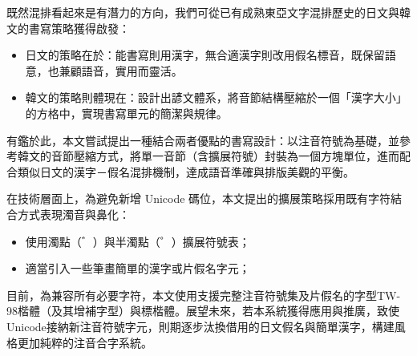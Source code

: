 既然混排看起來是有潛力的方向，我們可從已有成熟東亞文字混排歷史的日文與韓文的書寫策略獲得啟發：
\begin{itemize}
	\item 日文的策略在於：能書寫則用漢字，無合適漢字則改用假名標音，既保留語意，也兼顧語音，實用而靈活。
	\item 韓文的策略則體現在：設計出諺文體系，將音節結構壓縮於一個「漢字大小」的方格中，實現書寫單元的簡潔與規律。
\end{itemize}

有鑑於此，本文嘗試提出一種結合兩者優點的書寫設計：以注音符號為基礎，並參考韓文的音節壓縮方式，將單一音節（含擴展符號）封裝為一個方塊單位，進而配合類似日文的漢字－假名混排機制，達成語音準確與排版美觀的平衡。\par

在技術層面上，為避免新增 Unicode 碼位，本文提出的擴展策略採用既有字符結合方式表現濁音與鼻化：
\begin{itemize}
	\item 使用濁點（゛）與半濁點（゜）擴展符號表；
	\item 適當引入一些筆畫簡單的漢字或片假名字元；
\end{itemize}
目前，為兼容所有必要字符，本文使用支援完整注音符號集及片假名的字型TW-98楷體（及其增補字型）與標楷體。展望未來，若本系統獲得應用與推廣，致使Unicode接納新注音符號字元，則期逐步汰換借用的日文假名與簡單漢字，構建風格更加純粹的注音合字系統。\par
\clearpage